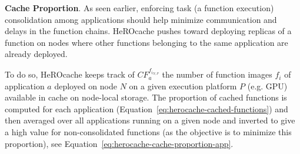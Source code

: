 
\textbf{Cache Proportion}. 
As seen earlier, enforcing task (a function execution) consolidation among applications should help minimize communication and delays in the function chains. HeROcache pushes toward deploying replicas of a function on nodes where other functions belonging to the same application are already deployed.

To do so, HeROcache keeps track of $CF_{a}^{{f}_{i_{N, P}}}$ the number of function images ${f}_{i}$ of application $a$ deployed on node $N$ on a given execution platform $P$ (e.g. GPU) available in cache on node-local storage. The proportion of cached functions is computed for each application (Equation~\ref{eq:herocache-cached-functions}) and then averaged over all applications running on a given node and inverted to give a high value for non-consolidated functions (as the objective is to minimize this proportion), see Equation~\ref{eq:herocache-cache-proportion-app}.



